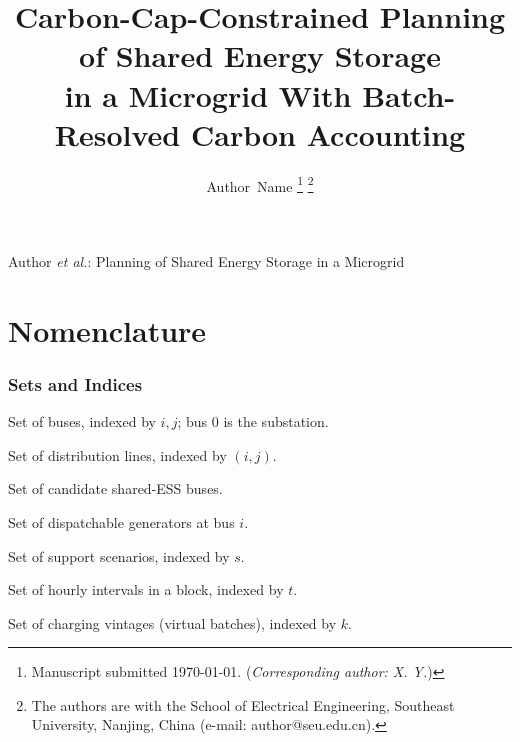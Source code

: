 \documentclass[journal]{IEEEtran}
\begin{document}
\title{Carbon-Cap-Constrained Planning of Shared Energy Storage\\ in a Microgrid With Batch-Resolved Carbon Accounting}

\author{Author~Name%
\thanks{Manuscript submitted \today. (\textit{Corresponding author: X. Y.})}%
\thanks{The authors are with the School of Electrical Engineering,
Southeast University, Nanjing, China (e-mail: author@seu.edu.cn).}}

%
{Author \MakeLowercase{\textit{et al.}}: Planning of Shared Energy Storage in a Microgrid}

\maketitle

\section*{Nomenclature}

\subsubsection*{Sets and Indices}
\begin{IEEEdescription}
\item[$\mathcal{N}$] Set of buses, indexed by $i,j$; bus $0$ is the substation.
\item[$\mathcal{L}$] Set of distribution lines, indexed by $(i,j)$.
\item[$\mathcal{N}^{\mathrm{es}}$] Set of candidate shared-ESS buses.
\item[$\mathcal{G}_i$] Set of dispatchable generators at bus $i$.
\item[$\mathcal{S}$] Set of support scenarios, indexed by $s$.
\item[$\mathcal{T}$] Set of hourly intervals in a block, indexed by $t$.
\item[$\mathcal{K}$] Set of charging vintages (virtual batches), indexed by $k$.
\end{IEEEdescription}
\end{document}
